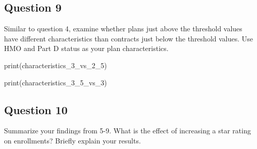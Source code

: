 \documentclass[
]{article}
\newenvironment{Shaded}{\begin{snugshade}}{\end{snugshade}}
\newcommand{\FunctionTok}[1]{\textcolor[rgb]{0.28,0.35,0.67}{#1}}
\newcommand{\NormalTok}[1]{\textcolor[rgb]{0.00,0.23,0.31}{#1}}
\begin{document}
\subsection{Question 9}\label{question-9}

Similar to question 4, examine whether plans just above the threshold
values have different characteristics than contracts just below the
threshold values. Use HMO and Part D status as your plan
characteristics.

\begin{Shaded}
\begin{Highlighting}[]
\FunctionTok{print}\NormalTok{(characteristics\_3\_vs\_2\_5)}

\FunctionTok{print}\NormalTok{(characteristics\_3\_5\_vs\_3)}
\end{Highlighting}
\end{Shaded}

\subsection{Question 10}\label{question-10}

Summarize your findings from 5-9. What is the effect of increasing a
star rating on enrollments? Briefly explain your results.
\end{document}
